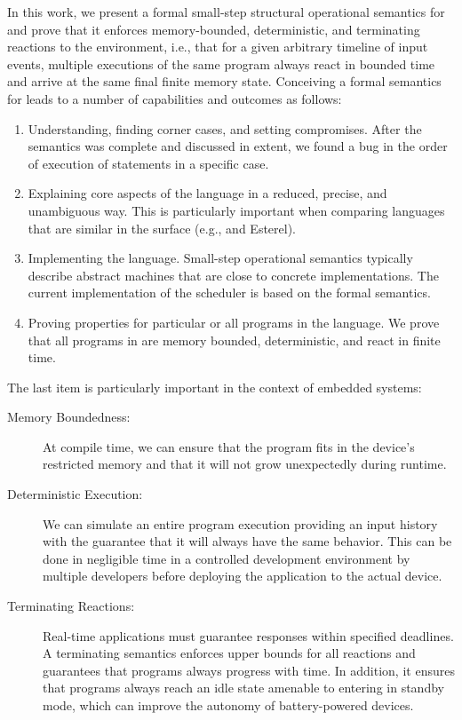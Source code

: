 In this work, we present a formal small-step structural operational
semantics for \CEU and prove that it enforces memory-bounded, deterministic,
and terminating reactions to the environment, i.e., that for a given
arbitrary timeline of input events, multiple executions of the same program
always react in bounded time and arrive at the same final finite memory
state.
%
Conceiving a formal semantics for \CEU leads to a number of capabilities and
outcomes as follows:

\begin{enumerate}
\item
    Understanding, finding corner cases, and setting compromises.
    After the semantics was complete and discussed in extent, we found a bug in
    the order of execution of statements in a specific case.
\item
    Explaining core aspects of the language in a reduced, precise, and
    unambiguous way.
    This is particularly important when comparing languages that are similar in
    the surface (e.g., \CEU and Esterel).
\item
    Implementing the language.
    Small-step operational semantics typically describe abstract machines that
    are close to concrete implementations.
    The current implementation of the \CEU scheduler is based on the formal
    semantics.
\item
    Proving properties for particular or all programs in the language.
    We prove that all programs in \CEU are memory bounded, deterministic, and
    react in finite time.
\end{enumerate}

The last item is particularly important in the context of embedded systems:

\begin{description}
\item[Memory Boundedness:]
At compile time, we can ensure that the program fits in the device's restricted
memory and that it will not grow unexpectedly during runtime.
\item[Deterministic Execution:]
We can simulate an entire program execution providing an input history with the
guarantee that it will always have the same behavior.
This can be done in negligible time in a controlled development environment by
multiple developers before deploying the application to the actual device.
\item[Terminating Reactions:]
Real-time applications must guarantee responses within specified deadlines.
A terminating semantics enforces upper bounds for all reactions and guarantees
that programs always progress with time.
In addition, it ensures that programs always reach an idle state amenable
to entering in standby mode, which can improve the autonomy of battery-powered
devices.
\end{description}
